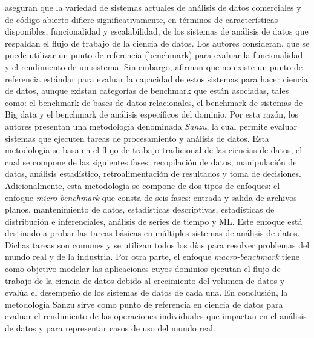 \cite{Watson2017} aseguran que la variedad de sistemas actuales de análisis de datos comerciales y de código abierto difiere significativamente, en términos de características disponibles, funcionalidad y escalabilidad, de los sistemas de análisis de datos que respaldan el flujo de trabajo de la ciencia de datos. Los autores consideran, que se puede utilizar un punto de referencia (benchmark) para evaluar la funcionalidad y el rendimiento de un sistema. Sin embargo, afirman que no existe un punto de referencia estándar para evaluar la capacidad de estos sistemas para hacer ciencia de datos, aunque existan categorías de benchmark que están asociadas, tales como: el benchmark de bases de datos relacionales, el benchmark de sistemas de Big data y el benchmark de análisis específicos del dominio. Por esta razón, los autores presentan una metodología denominada \textit{Sanzu}, la cual permite evaluar sistemas que ejecuten tareas de procesamiento y análisis de datos. Esta metodología se basa en el flujo de trabajo tradicional de las ciencias de datos, el cual se compone de las siguientes fases: recopilación de datos, manipulación de datos, análisis estadístico, retroalimentación de resultados y toma de decisiones. Adicionalmente, esta metodología se compone de dos tipos de enfoques: el enfoque \textit{micro-benchmark} que consta de seis fases: entrada y salida de archivos planos, mantenimiento de datos, estadísticas descriptivas, estadísticas de distribución e inferenciales, análisis de series de tiempo y ML. Este enfoque está destinado a probar las tareas básicas en múltiples sistemas de análisis de datos. Dichas tareas son comunes y se utilizan todos los días para resolver problemas del mundo real y de la industria. Por otra parte, el enfoque \textit{macro-benchmark} tiene como objetivo modelar las aplicaciones cuyos dominios ejecutan el flujo de trabajo de la ciencia de datos debido al crecimiento del volumen de datos y evalúa el desempeño de los sistemas de datos de cada una. En conclusión, la metodología Sanzu sirve como punto de referencia en ciencia de datos para evaluar el rendimiento de las operaciones individuales que impactan en el análisis de datos y para representar casos de uso del mundo real.

